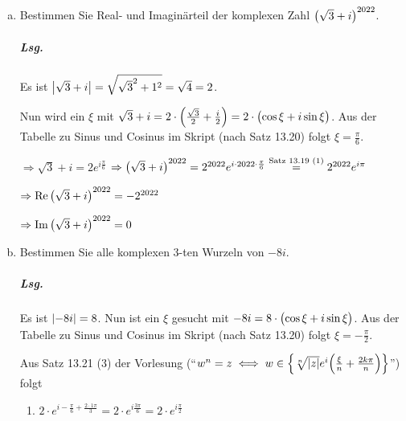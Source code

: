 \documentclass{scrreprt}
\begin{document}
\begin{enumerate}[(a)]
\item Bestimmen Sie Real- und Imaginärteil der komplexen Zahl
  $\qty\big(\sqrt{3} + i)^{2022}$.

  \subparagraph{Lsg.} Es ist $\abs{\sqrt{3} + i} = \sqrt{\sqrt{3}^2 + 1^2}
  = \sqrt{4} = 2$.

  Nun wird ein $\xi$ mit
  $\sqrt{3} + i = 2 \cdot \qty\Big(\frac{\sqrt{3}}{2} + \frac{i}{2})
  = 2 \cdot \qty\big(\cos \xi + i \sin \xi)$.
  Aus der Tabelle zu Sinus und Cosinus im Skript (nach Satz 13.20) folgt
  $\xi = \frac{\pi}{6}$.

  $\Rightarrow \sqrt{3} + i = 2 e^{i \frac{\pi}{6}}$
  $\Rightarrow \qty\big(\sqrt{3} + i)^{2022}
  = 2^{2022} e^{i \cdot 2022 \cdot \frac{\pi}{6}}
  \overset{\text{Satz 13.19 (1)}}= 2^{2022} e^{i \pi}$


  $\Rightarrow \Re \qty\big(\sqrt{3} + i)^{2022} = - 2^{2022}$

  $\Rightarrow \Im \qty\big(\sqrt{3} + i)^{2022} = 0$

\item Bestimmen Sie alle komplexen 3-ten Wurzeln von $-8i$.

  \subparagraph{Lsg.} Es ist $\abs{-8i} = 8$.
  Nun ist ein $\xi$ gesucht mit $-8i = 8 \cdot \qty\big(\cos \xi + i \sin \xi)$.
  Aus der Tabelle zu Sinus und Cosinus im Skript (nach Satz 13.20) folgt
  $\xi = -\frac{\pi}{2}$.

  Aus Satz 13.21 (3) der Vorlesung (``$w^n = z \iff
  w \in \qty{\sqrt[n]{\abs{z}}e^i\qty(\frac{\xi}{n} + \frac{2k\pi}{n})}$'')
  folgt
  \begin{enumerate}[label={$w_{\arabic*} =$}]
  \item $2 \cdot e^{i -\frac{\pi}{6} + \frac{2 \cdot 1 \pi}{3}}
    = 2 \cdot e^{i \frac{3\pi}{6}} = 2 \cdot e^{i \frac{\pi}{2}}$


\end{enumerate}
\end{enumerate}
\end{document}
